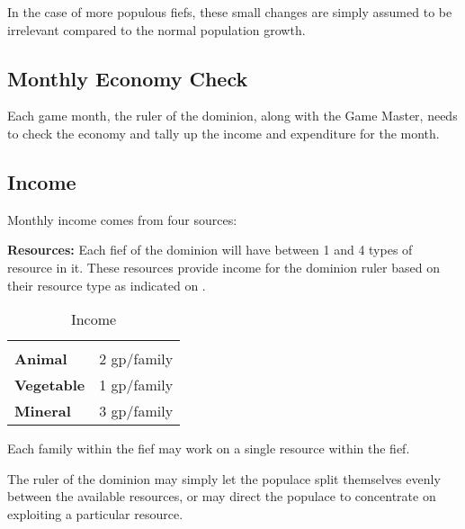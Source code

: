 \begin{multicols*}{2}
In the case of more populous fiefs, these small changes are simply assumed to be irrelevant compared to the normal population growth.


\subsection{Monthly Economy Check}
Each game month, the ruler of the dominion, along with the Game Master, needs to check the economy and tally up the income and expenditure for the month.

\subsection{Income}
Monthly income comes from four sources:

\textbf{Resources:} Each fief of the dominion will have between 1 and 4 types of resource in it. These resources provide income for the dominion ruler based on their resource type as indicated on .

\begin {table}[H]
  \caption{Income}\label{tab:Income}
  \begin{tabularx}{\columnwidth}{>{\bfseries}YY}
	 & \\
	Animal & 2 gp/family\\
	Vegetable & 1 gp/family\\
	Mineral & 3 gp/family
  \end {tabularx}
\end {table}

Each family within the fief may work on a single resource within the fief.

The ruler of the dominion may simply let the populace split themselves evenly between the available resources, or may direct the populace to concentrate on exploiting a particular resource.


\end{multicols*}
